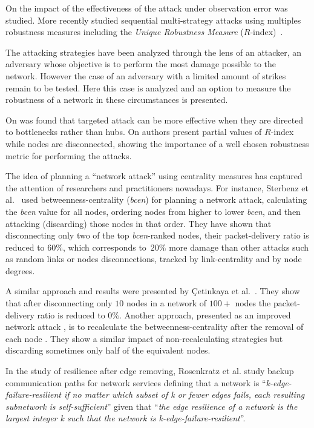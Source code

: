 \documentclass{sig-alternate-10pt}
\begin{document}
On \cite{38booker2012effects} the impact of the effectiveness of the attack under observation error was studied. More recently \cite{ventresca2015network} studied sequential multi-strategy attacks using multiples robustness measures including the \textit{Unique Robustness Measure} ($R$-index)~\cite{schneider2011mitigation}. 


The attacking strategies have been analyzed through the lens of an attacker, an adversary whose objective is to perform the most damage possible to the network. However the case of an adversary with a limited amount of strikes remain to be tested. Here this case is analyzed and an option to measure the robustness of a network in these circumstances is presented.

On \cite{32estrada2006network} was found that targeted attack can be more effective when they are directed to bottlenecks rather than hubs. On \cite{miuz} authors present partial values of $R$-index while nodes are disconnected, showing the importance of a well chosen robustness metric for performing the attacks.

The idea of planning a ``network attack'' using centrality measures has captured the attention of researchers and practitioners nowadays. For instance, Sterbenz et al.~\cite{sterbenz2011modelling} used bet\-ween\-ness-centrality (\textit{bcen}) for planning a network attack, calculating the \textit{bcen} value for all nodes, ordering nodes from higher to lower \textit{bcen}, and then attacking (discarding) those nodes in that order. They have shown that disconnecting only two of the top \textit{bcen}-ranked nodes, their packet-delivery ratio is reduced to $60\%$, which corresponds to~$20\%$ more damage than other attacks such as random links or nodes disconnections, tracked by link-centrality and by node degrees.  

A similar approach and results were presented by {\c{C}}etin\-kaya et al.~\cite{ccetinkaya2013modelling}. They show that after disconnecting only $10$ nodes in a network of $100+$ nodes the packet-delivery ratio is reduced to $0\%$. Another approach, presented as an improved network attack \cite{rak2010survivability, sydney2010characterising}, is to recalculate the betweenness-centrality after the removal of each node \cite{holme2002attack,molisz2006end}. They show a similar impact of non-recalculating strategies but discarding sometimes only half of the equivalent nodes. 

In the study of resilience after edge removing, Rosen\-kratz et al. \cite{rosenkrantz2009resilience} study backup communication paths for network services defining that a network is ``\textit{k-edge-failure-resilient if no matter which subset of k or fewer edges fails, each resulting subnetwork is self-sufficient}'' given that ``\textit{the edge resilience of a network is the largest integer k such that the network is k-edge-failure-resilient}''.
\end{document}
